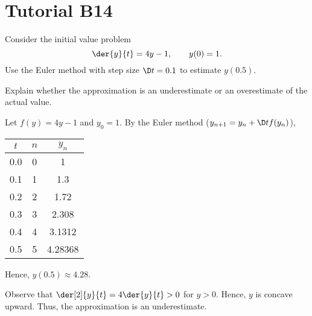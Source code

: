 \section{Tutorial B14}

\begin{problem}
    Consider the initial value problem \[\der{y}{t} = 4y - 1, \qquad y(0) = 1.\] Use the Euler method with step size $\D t = 0.1$ to estimate $y(0.5)$.

    Explain whether the approximation is an underestimate or an overestimate of the actual value.
\end{problem}
\begin{solution}
    Let $f(y) = 4y-1$ and $y_0 = 1$. By the Euler method ($y_{n+1} = y_n + \D t f(y_n)$),

    \begin{center}
        \begin{tabular}{|c|c|c|}
            \hline
            $t$ & $n$ & $y_n$ \\ \hline\hline
            0.0 & 0 & 1 \\ \hline
            0.1 & 1 & 1.3 \\ \hline
            0.2 & 2 & 1.72 \\ \hline
            0.3 & 3 & 2.308 \\ \hline
            0.4 & 4 & 3.1312 \\ \hline
            0.5 & 5 & 4.28368 \\ \hline
        \end{tabular}
    \end{center}

    Hence, $y(0.5) \approx 4.28$.

    Observe that $\der[2]{y}{t} = 4\der{y}{t} > 0$ for $y > 0$. Hence, $y$ is concave upward. Thus, the approximation is an underestimate.
\end{solution}

